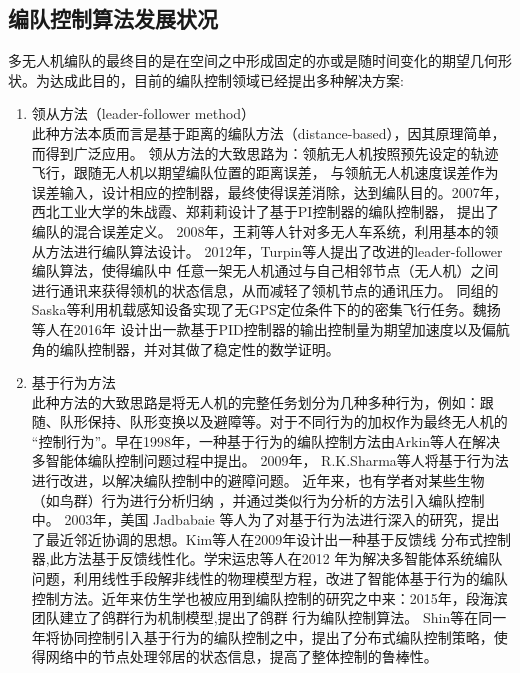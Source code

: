 \subsection{编队控制算法发展状况}
多无人机编队的最终目的是在空间之中形成固定的亦或是随时间变化的期望几何形状。为达成此目的，目前的编队控制领域已经提出多种解决方案:
\begin{enumerate}
    \item 领从方法（leader-follower method）\\
        此种方法本质而言是基于距离的编队方法（distance-based），因其原理简单，而得到广泛应用。
        领从方法的大致思路为：领航无人机按照预先设定的轨迹飞行，跟随无人机以期望编队位置的距离误差，
        与领航无人机速度误差作为误差输入，设计相应的控制器，最终使得误差消除，达到编队目的。2007年，
        西北工业大学的朱战霞、郑莉莉设计了基于PI控制器的编队控制器，
        提出了编队的混合误差定义。\cite{ZhuZhanXia2007}
        2008年，王莉等人针对多无人车系统，利用基本的领从方法进行编队算法设计。\cite{WangLi2008}
        2012年，Turpin等人提出了改进的leader-follower 编队算法，使得编队中
        任意一架无人机通过与自己相邻节点（无人机）之间进行通讯来获得领机的状态信息，从而减轻了领机节点的通讯压力。
        \cite{Turpin2012Trajectory}同组的Saska等利用机载感知设备实现了无GPS定位条件下的的密集飞行任务。\cite{Saska2017System}魏扬等人在2016年
        设计出一款基于PID控制器的输出控制量为期望加速度以及偏航角的编队控制器，并对其做了稳定性的数学证明。\cite{WeiYang2016}
    \item 基于行为方法\\
        此种方法的大致思路是将无人机的完整任务划分为几种多种行为，例如：跟随、队形保持、队形变换以及避障等。对于不同行为的加权作为最终无人机的
        “控制行为”。早在1998年，一种基于行为的编队控制方法由Arkin等人在解决多智能体编队控制问题过程中提出。\cite{Balch1998Behavior} 2009年，
        R.K.Sharma等人将基于行为法进行改进，以解决编队控制中的避障问题。\cite{Sharma2009Collision} 近年来，也有学者对某些生物（如鸟群）行为进行分析归纳
        ，并通过类似行为分析的方法引入编队控制中。
        2003年，美国 Jadbabaie 等人为了对基于行为法进行深入的研究，提出了最近邻近协调的思想。\cite{Jadbabaie2003Coordination}Kim等人在2009年设计出一种基于反馈线
        分布式控制器,此方法基于反馈线性化。\cite{Kim2009}学宋运忠等人在2012 年为解决多智能体系统编队
        问题，利用线性手段解非线性的物理模型方程，改进了智能体基于行为的编队控制方法。\cite{SongYunZhong2012}近年来仿生学也被应用到编队控制的研究之中来：2015年，段海滨团队建立了鸽群行为机制模型,提出了鸽群
        行为编队控制算法。\cite{DuanHaiBin2015}
        Shin等在同一年将协同控制引入基于行为的编队控制之中，提出了分布式编队控制策略，使得网络中的节点处理邻居的状态信息，提高了整体控制的鲁棒性。\cite{Jongho2015}

\end{enumerate}

